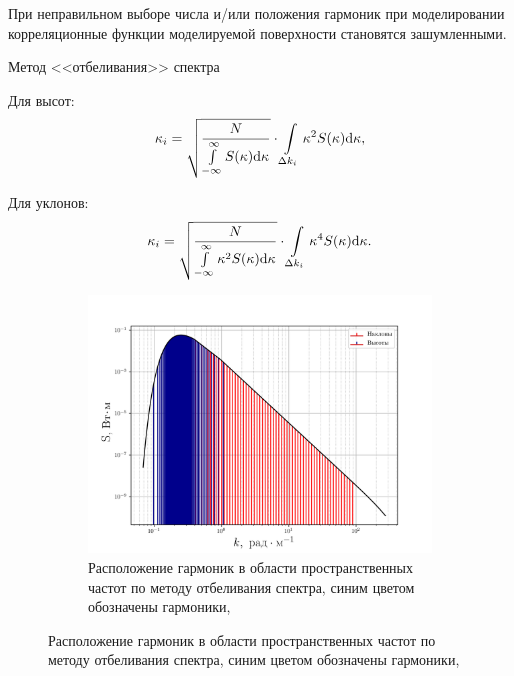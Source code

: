 \documentclass[10pt,pdf,hyperref={unicode}, dvipsnames]{beamer}
\begin{document}
\begin{frame}[t]{}
    При неправильном выборе числа и/или положения гармоник при
    моделировании корреляционные
    функции моделируемой поверхности становятся зашумленными. 


\end{frame}

\begin{frame}[t]{Метод <<отбеливания>> спектра}
\begin{minipage}{0.49\linewidth}
    \centering
    Для высот:
\begin{equation}
    \footnotesize
    \kappa_i = \sqrt{\frac{N}{\int\limits_{-\infty}^{\infty} S(\kappa)
    \dd \kappa}} \cdot \int\limits_{\Delta k_i} \kappa^2
        S(\kappa) \dd \kappa, 
\end{equation}

\end{minipage}
\hfill
\begin{minipage}{0.45\linewidth}
    \centering
    Для уклонов: 
\begin{equation}
    \footnotesize
    \kappa_i = \sqrt{\frac{N}{\int\limits_{-\infty}^{\infty} \kappa^2 S(\kappa)
    \dd \kappa}} \cdot \int\limits_{\Delta k_i} \kappa^4
        S(\kappa) \dd \kappa. 
\end{equation}
\end{minipage}
\begin{figure}[h!]
    \begin{subfigure}{0.45\linewidth}
        \includegraphics[width=\linewidth]{fig/fig3}
        \caption*{\footnotesize Расположение гармоник в области пространственных частот по
        методу отбеливания спектра, синим цветом обозначены гармоники,
}
\end{subfigure}
\end{figure}
\end{frame}
\end{document}
